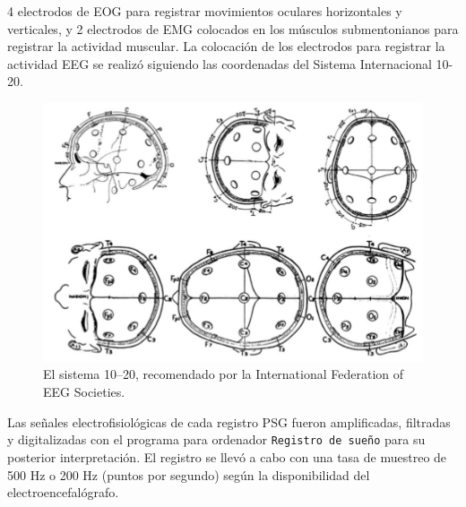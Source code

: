 4 electrodos de EOG para registrar movimientos oculares horizontales y verticales, 
y 2 electrodos de EMG colocados en los m\'usculos submentonianos para registrar la actividad 
muscular. 
La colocaci\'on de los electrodos para registrar la actividad EEG se realiz\'o siguiendo las 
coordenadas del Sistema Internacional 10-20\cite{Coleman87}.

\begin{figure}
\centering
\includegraphics[width=\linewidth]{figura_6.png} 
\caption{El sistema 10--20, recomendado por la
International Federation of EEG Societies. 
}
\end{figure}


Las se\~nales electrofisiol\'ogicas de cada registro PSG fueron amplificadas, filtradas y 
digitalizadas con el programa para ordenador \texttt{Registro de sue\~no} 
para su posterior interpretaci\'on. 
El registro se llev\'o a cabo con una tasa de muestreo de 500 Hz o 200 Hz (puntos por segundo)
seg\'un la disponibilidad del electroencefal\'ografo.

